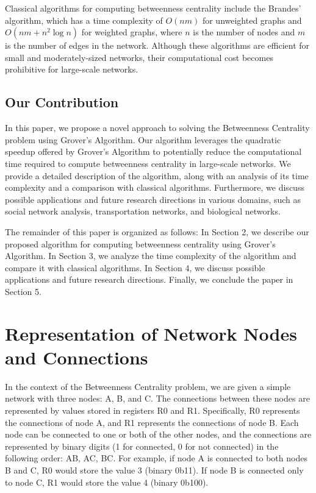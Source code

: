 Classical algorithms for computing betweenness centrality include the Brandes' algorithm, which has a time complexity of $O(nm)$ for unweighted graphs and $O(nm + n^2 \log n)$ for weighted graphs, where $n$ is the number of nodes and $m$ is the number of edges in the network. Although these algorithms are efficient for small and moderately-sized networks, their computational cost becomes prohibitive for large-scale networks.

\subsection{Our Contribution}

In this paper, we propose a novel approach to solving the Betweenness Centrality problem using Grover's Algorithm. Our algorithm leverages the quadratic speedup offered by Grover's Algorithm to potentially reduce the computational time required to compute betweenness centrality in large-scale networks. We provide a detailed description of the algorithm, along with an analysis of its time complexity and a comparison with classical algorithms. Furthermore, we discuss possible applications and future research directions in various domains, such as social network analysis, transportation networks, and biological networks.

The remainder of this paper is organized as follows: In Section 2, we describe our proposed algorithm for computing betweenness centrality using Grover's Algorithm. In Section 3, we analyze the time complexity of the algorithm and compare it with classical algorithms. In Section 4, we discuss possible applications and future research directions. Finally, we conclude the paper in Section 5.

\section{Representation of Network Nodes and Connections}
In the context of the Betweenness Centrality problem, we are given a simple network with three nodes: A, B, and C. The connections between these nodes are represented by values stored in registers R0 and R1. Specifically, R0 represents the connections of node A, and R1 represents the connections of node B. Each node can be connected to one or both of the other nodes, and the connections are represented by binary digits (1 for connected, 0 for not connected) in the following order: AB, AC, BC. For example, if node A is connected to both nodes B and C, R0 would store the value 3 (binary 0b11). If node B is connected only to node C, R1 would store the value 4 (binary 0b100).


